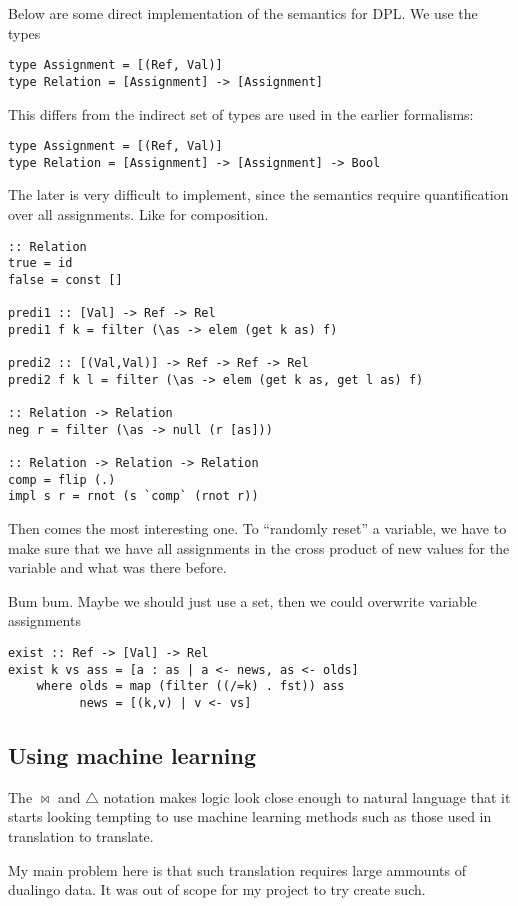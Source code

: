 \documentclass[12pt]{article}
\begin{document}
Below are some direct implementation of the semantics for DPL. We use the types
\begin{lstlisting}
type Assignment = [(Ref, Val)]
type Relation = [Assignment] -> [Assignment]
\end{lstlisting}
This differs from the indirect set of types are used in the earlier formalisms:
\begin{lstlisting}
type Assignment = [(Ref, Val)]
type Relation = [Assignment] -> [Assignment] -> Bool
\end{lstlisting}
The later is very difficult to implement, since the semantics require quantification over all assignments. Like for composition.

\begin{lstlisting}
:: Relation
true = id
false = const []

predi1 :: [Val] -> Ref -> Rel
predi1 f k = filter (\as -> elem (get k as) f)

predi2 :: [(Val,Val)] -> Ref -> Ref -> Rel
predi2 f k l = filter (\as -> elem (get k as, get l as) f)

:: Relation -> Relation
neg r = filter (\as -> null (r [as]))

:: Relation -> Relation -> Relation
comp = flip (.)
impl s r = rnot (s `comp` (rnot r))
\end{lstlisting}
Then comes the most interesting one. To ``randomly reset'' a variable, we have to make sure that we have all assignments in the cross product of new values for the variable and what was there before.

Bum bum. Maybe we should just use a set, then we could overwrite variable assignments
\begin{lstlisting}
exist :: Ref -> [Val] -> Rel
exist k vs ass = [a : as | a <- news, as <- olds]
	where olds = map (filter ((/=k) . fst)) ass
	      news = [(k,v) | v <- vs]
\end{lstlisting}



\subsection{Using machine learning}
The $\bowtie$ and $\triangle$ notation makes logic look close enough to natural language that it starts looking tempting to use machine learning methods such as those used in translation to translate.

My main problem here is that such translation requires large ammounts of dualingo data. It was out of scope for my project to try create such.
\end{document}
